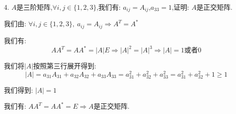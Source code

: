 4. $A$是三阶矩阵,$\forall i,j\in\{1,2,3\}$,我们有: $a_{ij}=A_{ij}$,$a_{33}=1$,证明: $A$是正交矩阵.
\begin{solution}
	
	我们由: $\forall i,j\in\{1,2,3\},\ a_{ij}=A_{ij}\Rightarrow A^{T}=A^{*}$
	
	我们有: $$AA^{T}=AA^{*}=|A|E\Rightarrow |A|^2=|A|^3\Rightarrow |A|=1\text{或者}0$$
	
	我们将$|A|$按照第三行展开得到: $$|A|=a_{31}A_{31}+a_{32}A_{32}+a_{33}A_{33}=a_{31}^2+a_{32}^2+a_{33}^2=a_{31}^2+a_{32}^2+1\geq 1$$
	
	我们得到: $|A|=1$
	
	我们有: $AA^{T}=AA^{*}=E\Rightarrow A\text{是正交矩阵}$.
\end{solution}
